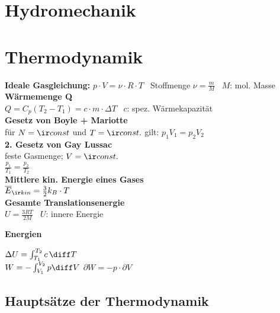 \documentclass[german, 8pt]{latex4ei/latex4ei_sheet}
\begin{document}
\section{Hydromechanik}

\section{Thermodynamik}

\textbf{Ideale Gasgleichung:} $p \cdot V = \nu \cdot R \cdot T$ \,
Stoffmenge $\nu = \frac{m}{M}$ \, $M$: mol. Masse\\
\textbf{Wärmemenge Q} \\
$Q=C_p(T_2-T_1)=c \cdot m \cdot \Delta T$ \, $c$: spez. Wärmekapazität \\

\textbf{Gesetz von Boyle + Mariotte} \\
für $N=\ir const$ und $T=\ir const.$ gilt: $p_1V_1=p_2V_2$ \\

\textbf{2. Gesetz von Gay Lussac} \\
feste Gasmenge; $V=\ir const.$\\
$\frac{p_1}{T_1}=\frac{p_2}{T_2}$ \\

\textbf{Mittlere kin. Energie eines Gases} \\
$\overline{E}_{\ir kin}=\frac{3}{2}k_B \cdot T$ \\

\textbf{Gesamte Translationsenergie} \\
$U=\frac{3RT}{2M}$ \, $U$: innere Energie

\textbf{Energien}
\begin{sectionbox}
$\Delta U = \int_{T_1}^{T_2} c \, \diff T$\\
$W=-\int_{V_1}^{V_2} p \diff V$ \qquad $\partial W= -p \cdot \partial V$

\end{sectionbox}

\subsection{Hauptsätze der Thermodynamik}
\end{document}
